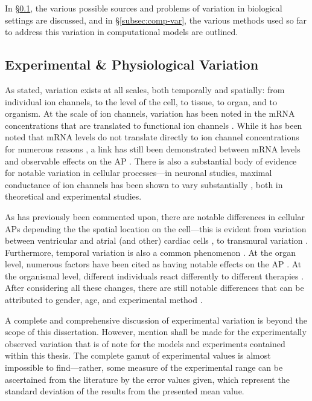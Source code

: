 \documentclass[../thesis-main.tex]{subfiles}
\begin{document}
In \S\ref{subsec:experimental-var}, the various possible sources and problems of variation in biological settings are discussed, and in \S\ref{subsec:comp-var}, the various methods used so far to address this variation in computational models are outlined.

\subsection{Experimental \& Physiological Variation}
\label{subsec:experimental-var}
As stated, variation exists at all scales, both temporally and spatially: from individual ion channels, to the level of the cell, to tissue, to organ, and to organism. At the scale of ion channels, variation has been noted in the mRNA concentrations that are translated to functional ion channels \citep{Gaborit2007}. While it has been noted that mRNA levels do not translate directly to ion channel concentrations for numerous reasons \citep{Edelman2001, Nattel2010}, a link has still been demonstrated between mRNA levels and observable effects on the AP \citep{Walmsley2013}. There is also a substantial body of evidence for notable variation in cellular processes---in neuronal studies, maximal conductance of ion channels has been shown to vary substantially \citep{Marder2011, Goaillard2009, Schulz2006}, both in theoretical and experimental studies.

As has previously been commented upon, there are notable differences in cellular APs depending the the spatial location on the cell---this is evident from variation between ventricular and atrial (and other) cardiac cells \citep{Carmeliet2002}, to transmural variation \citep{Antzelevitch1991}. Furthermore, temporal variation is also a common phenomenon \citep{Walmsley2010}. At the organ level, numerous factors have been cited as having notable effects on the AP \citep{Taylor1997}. At the organismal level, different individuals react differently to different therapies \citep{Kannankeril2010}. After considering all these changes, there are still notable differences that can be attributed to gender, age, and experimental method \citep{Yang2012, Kurokawa2012}.

A complete and comprehensive discussion of experimental variation is beyond the scope of this dissertation. However, mention shall be made for the experimentally observed variation that is of note for the models and experiments contained within this thesis. The complete gamut of experimental values is almost impossible to find---rather, some measure of the experimental range can be ascertained from the literature by the error values given, which represent the standard deviation of the results from the presented mean value.
\end{document}
